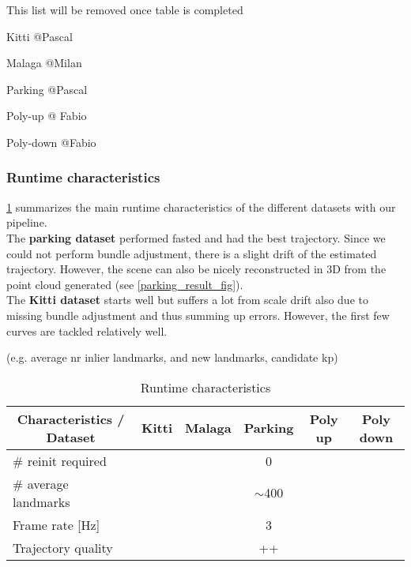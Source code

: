 This list will be removed once table is completed
\begin{compactitem}
	\item Kitti @Pascal
	\item Malaga @Milan
	\item Parking @Pascal
	\item Poly-up @ Fabio
	\item Poly-down @Fabio
\end{compactitem}
	
	
\subsubsection{Runtime characteristics}
\cref{runtime_table} summarizes the main runtime characteristics of the different datasets with our pipeline.\\

The \textbf{parking dataset} performed fasted and had the best trajectory. Since we could not perform bundle adjustment, there is a slight drift of the estimated trajectory. However, the scene can also be nicely reconstructed in 3D from the point cloud generated (see \cref{parking_result_fig}).\\

The \textbf{Kitti dataset} starts well but suffers a lot from scale drift also due to missing bundle adjustment and thus summing up errors. However, the first few curves are tackled relatively well.

(e.g. average nr inlier landmarks, and new landmarks, candidate kp)
\begin{table}[h!!]
	\centering
	\begin{tabular}{|l|c|c|c|c|c|}
	\hline
	\multicolumn{1}{|c|}{\textbf{Characteristics / Dataset}} & \textbf{Kitti} & \textbf{Malaga} & \textbf{Parking} & \textbf{Poly up} & \textbf{Poly down} \\ \hline
	\# reinit required                                       &                &                 & 0                &                  &                    \\ \hline
	\# average landmarks                                     &                &                 & $\sim$400        &                  &                    \\ \hline
	Frame rate {[}Hz{]}                                      &                &                 & 3                &                  &                    \\ \hline
	Trajectory quality                                       &                &                 & ++               &                  &                    \\ \hline
	\end{tabular}
	\caption{Runtime characteristics}
	\label{runtime_table}
\end{table}


